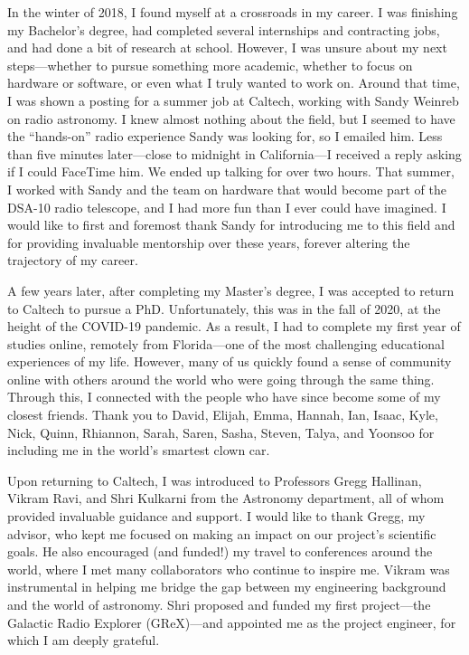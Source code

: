 \begin{acknowledgements} 	 
    In the winter of 2018, I found myself at a crossroads in my career.
    I was finishing my Bachelor’s degree, had completed several internships and contracting jobs, and had done a bit of research at school.
    However, I was unsure about my next steps—whether to pursue something more academic, whether to focus on hardware or software, or even what I truly wanted to work on.
    Around that time, I was shown a posting for a summer job at Caltech, working with Sandy Weinreb on radio astronomy.
    I knew almost nothing about the field, but I seemed to have the “hands-on” radio experience Sandy was looking for, so I emailed him.
    Less than five minutes later—close to midnight in California—I received a reply asking if I could FaceTime him.
    We ended up talking for over two hours.
    That summer, I worked with Sandy and the team on hardware that would become part of the DSA-10 radio telescope, and I had more fun than I ever could have imagined.
    I would like to first and foremost thank Sandy for introducing me to this field and for providing invaluable mentorship over these years, forever altering the trajectory of my career.

    A few years later, after completing my Master’s degree, I was accepted to return to Caltech to pursue a PhD.
    Unfortunately, this was in the fall of 2020, at the height of the COVID-19 pandemic.
    As a result, I had to complete my first year of studies online, remotely from Florida—one of the most challenging educational experiences of my life.
    However, many of us quickly found a sense of community online with others around the world who were going through the same thing.
    Through this, I connected with the people who have since become some of my closest friends.
    Thank you to David, Elijah, Emma, Hannah, Ian, Isaac, Kyle, Nick, Quinn, Rhiannon, Sarah, Saren, Sasha, Steven, Talya, and Yoonsoo for including me in the world’s smartest clown car.

    Upon returning to Caltech, I was introduced to Professors Gregg Hallinan, Vikram Ravi, and Shri Kulkarni from the Astronomy department, all of whom provided invaluable guidance and support.
    I would like to thank Gregg, my advisor, who kept me focused on making an impact on our project's scientific goals.
    He also encouraged (and funded!) my travel to conferences around the world, where I met many collaborators who continue to inspire me.
    Vikram was instrumental in helping me bridge the gap between my engineering background and the world of astronomy.
    Shri proposed and funded my first project—the Galactic Radio Explorer (GReX)—and appointed me as the project engineer, for which I am deeply grateful.


\end{acknowledgements}
